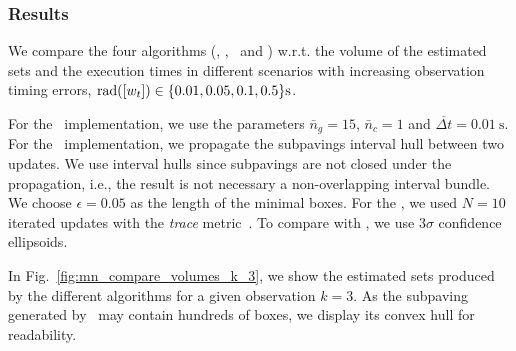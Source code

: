 \documentclass{ifacconf}
\begin{document}
\subsubsection{Results}
We compare the four algorithms (\czesmf, \vsiviashort, \iesmf\ and \ekf) w.r.t. the volume of the estimated sets and the execution times in different scenarios with increasing observation timing errors, $\rad{[w_t]}\in \{0.01,0.05,0.1,0.5\}\unit{\s}$.


%
%
For the \czesmf\ implementation, we use the parameters ${\bar{n}_g = 15}$, ${\bar{n}_c = 1}$ and ${\overline{\Delta t}=\qty{0.01}{\second}}$.
For the \vsiviashort\ implementation, we 
propagate the subpavings interval hull between two updates. We use interval hulls  since subpavings are not closed under the propagation, i.e., the result is not necessary a non-overlapping interval bundle. We choose ${\epsilon=0.05}$ as the length of the minimal boxes.
For the \iesmf, we used ${N=10}$ iterated updates with the \emph{trace} metric~\citep{Bolting2018b}.
To compare with \ekf, we use $3\sigma$ confidence ellipsoids.

In Fig.~\ref{fig:mn_compare_volumes_k_3}, we show the estimated sets produced by the different algorithms for a given observation ${k=3}$.
As the subpaving generated by \sivia\ may contain hundreds of boxes, we display its convex hull for readability.
\end{document}
